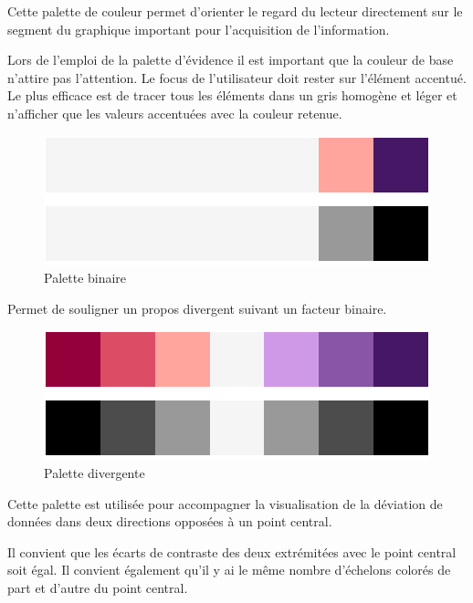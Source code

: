 \documentclass[a4paper,12pt]{article}
\begin{document}
\begin{multicols}{2}
Cette palette de couleur permet d'orienter le regard du lecteur directement sur le segment du graphique important pour l'acquisition de l'information.\autocite{andreaskrauseBestPracticesData2024}

Lors de l'emploi de la palette d'évidence il est important que la couleur de base n'attire pas l'attention. Le focus de l'utilisateur doit rester sur l'élément accentué.\autocite{wilkeColorScales2019}
Le plus efficace est de tracer tous les éléments dans un gris homogène et léger et n'afficher que les valeurs accentuées avec la couleur retenue. \autocite{wilkeColorScales2019}

\begin{figure}[H]
\centering
\includegraphics[width=.9\linewidth]{./img/palette-binaire.pdf}
\caption{\label{fig:org2e612b0}Palette binaire}
\end{figure}

Permet de souligner un propos divergent suivant un facteur binaire.\autocite{jonathanschwabishDevelopingDataVisualization2021} 

\begin{figure}[H]
\centering
\includegraphics[width=.9\linewidth]{./img/palette-divergente.pdf}
\caption{\label{fig:org06bd41a}Palette divergente}
\end{figure}

Cette palette est utilisée pour accompagner la visualisation de la déviation de données dans deux directions opposées à un point central. \autocite{wilkeColorScales2019}

Il convient que les écarts de contraste des deux extrémitées avec le point central soit égal. Il convient également qu'il y ai le même nombre d'échelons colorés de part et d'autre du point central. \autocite{wilkeColorScales2019}


\end{multicols}
\end{document}
